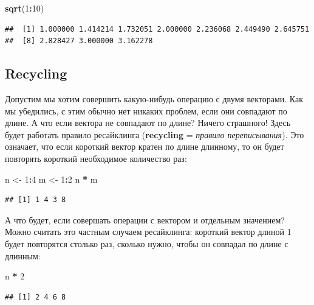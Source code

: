 \documentclass[]{book}
\newenvironment{Shaded}{\begin{snugshade}}{\end{snugshade}}
\newcommand{\DecValTok}[1]{\textcolor[rgb]{0.00,0.00,0.81}{#1}}
\newcommand{\KeywordTok}[1]{\textcolor[rgb]{0.13,0.29,0.53}{\textbf{#1}}}
\newcommand{\NormalTok}[1]{#1}
\newcommand{\OperatorTok}[1]{\textcolor[rgb]{0.81,0.36,0.00}{\textbf{#1}}}
\newcommand{\StringTok}[1]{\textcolor[rgb]{0.31,0.60,0.02}{#1}}
\begin{document}
\begin{Shaded}
\begin{Highlighting}[]
\KeywordTok{sqrt}\NormalTok{(}\DecValTok{1}\OperatorTok{:}\DecValTok{10}\NormalTok{)}
\end{Highlighting}
\end{Shaded}

\begin{verbatim}
##  [1] 1.000000 1.414214 1.732051 2.000000 2.236068 2.449490 2.645751
##  [8] 2.828427 3.000000 3.162278
\end{verbatim}

\hypertarget{recycling}{%
\subsection{Recycling}\label{recycling}}

Допустим мы хотим совершить какую-нибудь операцию с двумя векторами. Как мы убедились, с этим обычно нет никаких проблем, если они совпадают по длине. А что если вектора не совпадают по длине?
Ничего страшного! Здесь будет работать правило ресайклинга (\textbf{recycling} = \emph{правило переписывания}). Это означает, что если короткий вектор кратен по длине длинному, то он будет повторять короткий необходимое количество раз:

\begin{Shaded}
\begin{Highlighting}[]
\NormalTok{n <-}\StringTok{ }\DecValTok{1}\OperatorTok{:}\DecValTok{4}
\NormalTok{m <-}\StringTok{ }\DecValTok{1}\OperatorTok{:}\DecValTok{2}
\NormalTok{n }\OperatorTok{*}\StringTok{ }\NormalTok{m}
\end{Highlighting}
\end{Shaded}

\begin{verbatim}
## [1] 1 4 3 8
\end{verbatim}

А что будет, если совершать операции с вектором и отдельным значением? Можно считать это частным случаем ресайклинга: короткий вектор длиной 1 будет повторятся столько раз, сколько нужно, чтобы он совпадал по длине с длинным:

\begin{Shaded}
\begin{Highlighting}[]
\NormalTok{n }\OperatorTok{*}\StringTok{ }\DecValTok{2}
\end{Highlighting}
\end{Shaded}

\begin{verbatim}
## [1] 2 4 6 8
\end{verbatim}
\end{document}
